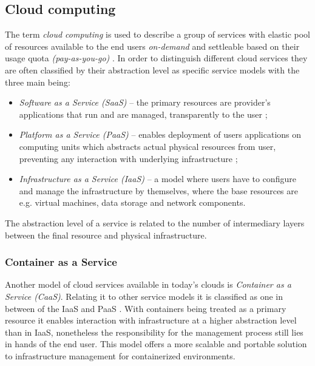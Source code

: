 \subsection{Cloud computing}
\label{s:ProblemDomain:Cloud}

The term \emph{cloud computing} is used to describe a group of services with elastic pool of resources available to the end users \emph{on-demand} and settleable based on their usage quota \emph{(pay-as-you-go)} \cite{b:Cloud-Principles-Paradigms}.
In order to distinguish different cloud services they are often classified by their abstraction level as specific service models with the three main being:

\begin{itemize}
  \item{
\emph{Software as a Service (SaaS)} -- the primary resources are provider's applications that run and are managed, transparently to the user
};
  \item{
\emph{Platform as a Service (PaaS)} -- enables deployment of users applications on computing units which abstracts actual physical resources from user, preventing any interaction with underlying infrastructure
};
  \item{
\emph{Infrastructure as a Service (IaaS)} -- a model where users have to configure and manage the infrastructure by themselves, where the base resources are e.g. virtual machines, data storage and network components.
}
\end{itemize}
The abstraction level of a service is related to the number of intermediary layers between the final resource and physical infrastructure.



\subsubsection{Container as a Service}
\label{s:ProblemDomain:CaaS}

Another model of cloud services available in today's clouds is \emph{Container as a Service (CaaS)}.
Relating it to other service models it is classified as one in between of the IaaS and PaaS \cite{b:IBM-CaaS}.
With containers being treated as a primary resource it enables interaction with infrastructure at a higher abstraction level than in IaaS, nonetheless the responsibility for the management process still lies in hands of the end user.
This model offers a more scalable and portable solution to infrastructure management for containerized environments.



